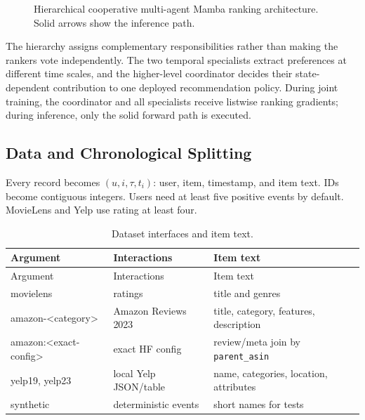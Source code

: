 \documentclass[11pt,a4paper]{article}
\begin{document}
\begin{figure}[H]
{}
\caption{Hierarchical cooperative multi-agent Mamba ranking architecture.
Solid arrows show the inference path.}
\label{fig:pipeline}
\end{figure}

The hierarchy assigns complementary responsibilities rather than making the
rankers vote independently. The two temporal specialists extract preferences at
different time scales, and the higher-level coordinator decides their
state-dependent contribution to one deployed recommendation policy. During joint
training, the coordinator and all specialists receive listwise ranking gradients;
during inference, only the solid forward path is executed.

\subsection{Data and Chronological Splitting}

Every record becomes $(u,i,\tau,t_i)$: user, item, timestamp, and item text. IDs become contiguous integers. Users need at least five positive events by default. MovieLens and Yelp use rating at least four.

\begin{longtable}{p{}p{}p{}}
\caption{Dataset interfaces and item text.}\label{tab:data}\\
\toprule
Argument & Interactions & Item text\\
\midrule
\endfirsthead
\toprule
Argument & Interactions & Item text\\
\midrule
\endhead
movielens & ratings & title and genres\\
amazon-\textless category\textgreater & Amazon Reviews 2023 & title, category, features, description\\
amazon:\textless exact-config\textgreater & exact HF config & review/meta join by \texttt{parent\_asin}\\
yelp19, yelp23 & local Yelp JSON/table & name, categories, location, attributes\\
synthetic & deterministic events & short names for tests\\
\bottomrule
\end{longtable}
\end{document}
